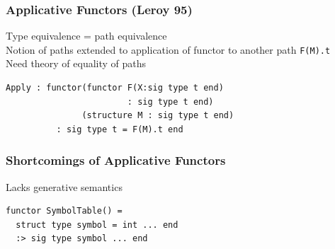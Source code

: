 \documentclass{beamer}
\begin{document}
\begin{frame}[fragile]
\frametitle{Applicative Functors (Leroy 95)}
Type equivalence = path equivalence\\
Notion of paths extended to application of functor to another path \lstinline{F(M).t}\\
Need theory of equality of paths\\ %
\begin{lstlisting}
Apply : functor(functor F(X:sig type t end) 
                        : sig type t end) 
               (structure M : sig type t end) 
          : sig type t = F(M).t end
\end{lstlisting}	
\end{frame}

\begin{frame}[fragile]
\frametitle{Shortcomings of Applicative Functors}
\begin{block}{Lacks generative semantics}
\begin{lstlisting}
functor SymbolTable() = 
  struct type symbol = int ... end 
  :> sig type symbol ... end
\end{lstlisting}
\end{block}
\end{frame}
\end{document}

